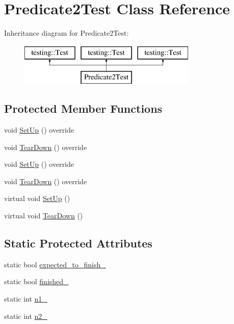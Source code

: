 \hypertarget{class_predicate2_test}{}\section{Predicate2\+Test Class Reference}
\label{class_predicate2_test}
Inheritance diagram for Predicate2\+Test\+:\begin{figure}[H]
\begin{center}
\leavevmode
\includegraphics[height=2.000000cm]{db/df2/class_predicate2_test}
\end{center}
\end{figure}
\subsection*{Protected Member Functions}
\begin{DoxyCompactItemize}
\item 
void \mbox{\hyperlink{class_predicate2_test_a18b81bef55647028d072d59dea11055f}{Set\+Up}} () override
\item 
void \mbox{\hyperlink{class_predicate2_test_ad1092fca5badfb925a576949f63e872b}{Tear\+Down}} () override
\item 
void \mbox{\hyperlink{class_predicate2_test_a18b81bef55647028d072d59dea11055f}{Set\+Up}} () override
\item 
void \mbox{\hyperlink{class_predicate2_test_ad1092fca5badfb925a576949f63e872b}{Tear\+Down}} () override
\item 
virtual void \mbox{\hyperlink{class_predicate2_test_a9778563daf4846327d32061c1a8ccba0}{Set\+Up}} ()
\item 
virtual void \mbox{\hyperlink{class_predicate2_test_a7379f8f7772af6b4c76edcc90b6aaaeb}{Tear\+Down}} ()
\end{DoxyCompactItemize}
\subsection*{Static Protected Attributes}
\begin{DoxyCompactItemize}
\item 
static bool \mbox{\hyperlink{class_predicate2_test_a56cf1f0f556addd9a62e0644dc1a86fc}{expected\+\_\+to\+\_\+finish\+\_\+}}
\item 
static bool \mbox{\hyperlink{class_predicate2_test_a30f4ef76d3004253078e767e5c653b85}{finished\+\_\+}}
\item 
static int \mbox{\hyperlink{class_predicate2_test_ac002d8e279b24e75906fd19973fc2170}{n1\+\_\+}}
\item 
static int \mbox{\hyperlink{class_predicate2_test_a9dbe5173570b9b911af2df889c287027}{n2\+\_\+}}
\end{DoxyCompactItemize}
